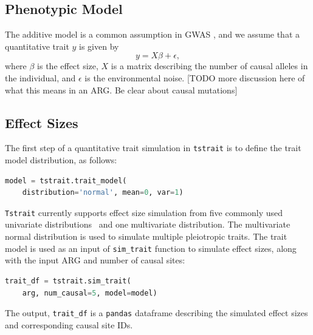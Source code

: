 \documentclass[unnumsec,webpdf,modern,large,namedate]{oup-authoring-template}%
\begin{document}
\subsection{Phenotypic Model}
The additive model is a common assumption in GWAS
\citep{uffelmann2021}, and we assume that a quantitative trait $y$
is given by
\[
y=X\beta+\epsilon,
\]
where $\beta$ is the effect size, $X$ is a matrix describing the number
of causal alleles in the individual, and $\epsilon$ is the environmental
noise.
[TODO more discussion here of what this means in an ARG. Be clear about
causal mutations]

\subsection{Effect Sizes}
The first step of a quantitative trait simulation in \texttt{tstrait} is to
define the trait model distribution, as follows:
\begin{lstlisting}[language=Python]
model = tstrait.trait_model(
    distribution='normal', mean=0, var=1)
\end{lstlisting}
\texttt{Tstrait} currently supports effect size simulation from five
commonly used univariate distributions~\citep{gaynor2021,haller2023}
and one multivariate distribution.
The multivariate normal distribution is used to simulate multiple
pleiotropic traits.
The trait model is used as an input of \texttt{sim\_trait} function to simulate
effect sizes, along with the input ARG and number of causal sites:
\begin{lstlisting}[language=Python]
trait_df = tstrait.sim_trait(
    arg, num_causal=5, model=model)
\end{lstlisting}
The output, \texttt{trait\_df} is a \texttt{pandas} dataframe
describing the simulated effect sizes and corresponding
causal site IDs.
\end{document}
